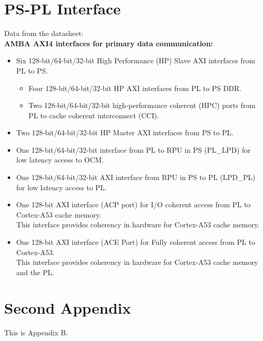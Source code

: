 \documentclass{article}
\begin{document}
\section{PS-PL Interface} \label{sec:appendixPS-PL_interface}
Data from the datasheet\cite{ZU9EG_datasheet}:\\
\noindent\textbf{AMBA AXI4 interfaces for primary data communication:}
\begin{itemize}
    \item Six 128-bit/64-bit/32-bit High Performance (HP) Slave AXI interfaces from PL to PS.
        \begin{itemize}
            \item Four 128-bit/64-bit/32-bit HP AXI interfaces from PL to PS DDR.
            \item Two 128-bit/64-bit/32-bit high-performance coherent (HPC) ports from PL to cache coherent interconnect (CCI).
        \end{itemize}
    \item Two 128-bit/64-bit/32-bit HP Master AXI interfaces from PS to PL.
    \item One 128-bit/64-bit/32-bit interface from PL to RPU in PS (PL\_LPD) for low latency access to OCM.
    \item One 128-bit/64-bit/32-bit AXI interface from RPU in PS to PL (LPD\_PL) for low latency access to PL.
    \item One 128-bit AXI interface (ACP port) for I/O coherent access from PL to Cortex-A53 cache memory.\\
        This interface provides coherency in hardware for Cortex-A53 cache memory.
    \item One 128-bit AXI interface (ACE Port) for Fully coherent access from PL to Cortex-A53.\\
        This interface provides coherency in hardware for Cortex-A53 cache memory and the PL.
\end{itemize}


\section{Second Appendix} \label{sec:appendixB}
This is Appendix B.
\end{document}
